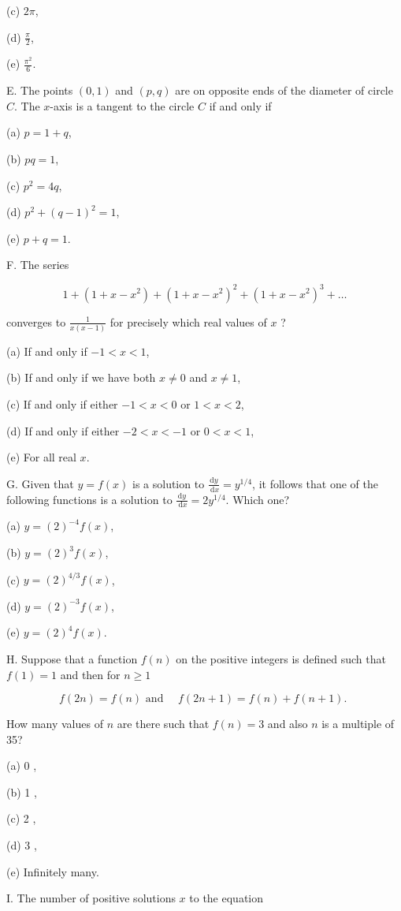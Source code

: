 \documentclass[10pt]{article}
\begin{document}
(c) $2 \pi$,

(d) $\frac{\pi}{2}$,

(e) $\frac{\pi^{2}}{6}$.

E. The points $(0,1)$ and $(p, q)$ are on opposite ends of the diameter of circle $C$. The $x$-axis is a tangent to the circle $C$ if and only if

(a) $p=1+q$,

(b) $p q=1$,

(c) $p^{2}=4 q$,

(d) $p^{2}+(q-1)^{2}=1$,

(e) $p+q=1$.

F. The series

$$
1+\left(1+x-x^{2}\right)+\left(1+x-x^{2}\right)^{2}+\left(1+x-x^{2}\right)^{3}+\ldots
$$

converges to $\frac{1}{x(x-1)}$ for precisely which real values of $x$ ?

(a) If and only if $-1<x<1$,

(b) If and only if we have both $x \neq 0$ and $x \neq 1$,

(c) If and only if either $-1<x<0$ or $1<x<2$,

(d) If and only if either $-2<x<-1$ or $0<x<1$,

(e) For all real $x$.

G. Given that $y=f(x)$ is a solution to $\frac{\mathrm{d} y}{\mathrm{~d} x}=y^{1 / 4}$, it follows that one of the following functions is a solution to $\frac{\mathrm{d} y}{\mathrm{~d} x}=2 y^{1 / 4}$. Which one?

(a) $y=(2)^{-4} f(x)$,

(b) $y=(2)^{3} f(x)$,

(c) $y=(2)^{4 / 3} f(x)$,

(d) $y=(2)^{-3} f(x)$,

(e) $y=(2)^{4} f(x)$.

H. Suppose that a function $f(n)$ on the positive integers is defined such that $f(1)=1$ and then for $n \geq 1$

$$
f(2 n)=f(n) \text { and } \quad f(2 n+1)=f(n)+f(n+1) \text {. }
$$

How many values of $n$ are there such that $f(n)=3$ and also $n$ is a multiple of 35?

(a) 0 ,

(b) 1 ,

(c) 2 ,

(d) 3 ,

(e) Infinitely many.

I. The number of positive solutions $x$ to the equation
\end{document}
